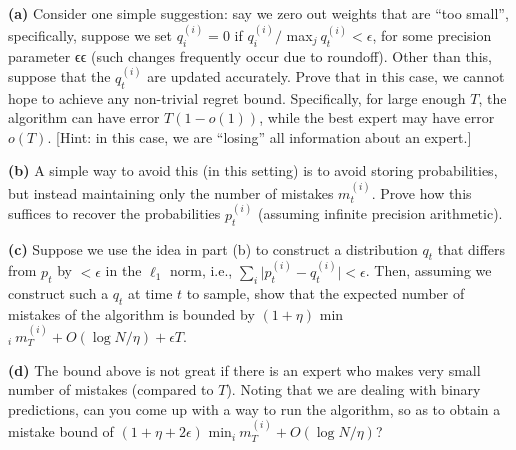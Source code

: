 \documentclass[11pt]{article}
\renewcommand\part[1]{\vspace{.10in}\textbf{(#1)}}
\begin{document}
\part{a} Consider one simple suggestion: say we zero out weights that are ``too small'', specifically, suppose we set $q_i^{(i)} = 0$ if $q_i^{(i)} /$ max$_j \ q_t^{(i)} < \epsilon$, for some precision parameter ϵϵ (such changes frequently occur due to roundoff). Other than this, suppose that the $q_t^{(i)}$ are updated accurately. Prove that in this case, we cannot hope to achieve any non-trivial regret bound. Specifically, for large enough $T$, the algorithm can have error $T(1 - o(1))$, while the best expert may have error $o(T)$. [Hint: in this case, we are ``losing'' all information about an expert.]

\part{b} A simple way to avoid this (in this setting) is to avoid storing probabilities, but instead maintaining only the number of mistakes $m_t^{(i)}$. Prove how this suffices to recover the probabilities $p_t^{(i)}$ (assuming infinite precision arithmetic).


\part{c}  Suppose we use the idea in part (b) to construct a distribution $q_t$ that differs from $p_t$ by $< \epsilon$ in the $\ell_1$ norm, i.e., 
$\sum_i \vert p_t^{(i)} - q_t^{(i)} \vert < \epsilon$. Then, assuming we construct such a $q_t$ at time $t$ to sample, show that the expected number of mistakes of the algorithm is bounded by $(1 + \eta)$ min$_i \ m_T^{(i)} + O(\log N/\eta) + \epsilon T$.


\part{d} The bound above is not great if there is an expert who makes very small number of mistakes (compared to $T$). Noting that we are dealing with binary predictions, can you come up with a way to run the algorithm, so as to obtain a mistake bound of $(1 + \eta + 2 \epsilon)$ min$_i \ m_T^{(i)} + O(\log N/\eta)$?

\end{document}
